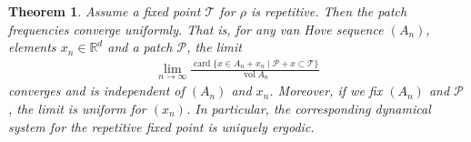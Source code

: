 \documentclass[10pt,a4paper]{amsart}
\newtheorem{theorem}{Theorem}
\DeclareMathOperator{\card}{card}
\DeclareMathOperator{\vol}{vol}
\begin{document}
\begin{theorem}\label{thm_uniform_patch_freq}
    Assume a fixed point $\mathcal{{T}}$ for $\rho$ is repetitive. Then the patch frequencies converge uniformly. That is, 
    for any van Hove sequence $(A_n)$,
    elements $x_n\in\mathbb{R}^d$
    and a patch $\mathcal{{P}}$, the
    limit
    \begin{align*}
    \lim_{n\rightarrow\infty}\frac{\card\{x\in A_n+x_n\mid \mathcal{P}+x\subset\mathcal{T}\}}{\vol A_n}
    \end{align*}
    converges and is independent of $(A_n)$ and $x_n$.
    Moreover, if we fix $(A_n)$ and $\mathcal{P}$, the limit is uniform for $(x_n)$.
    In particular, the corresponding dynamical system for the repetitive fixed point is uniquely ergodic.
\end{theorem}
\end{document}
